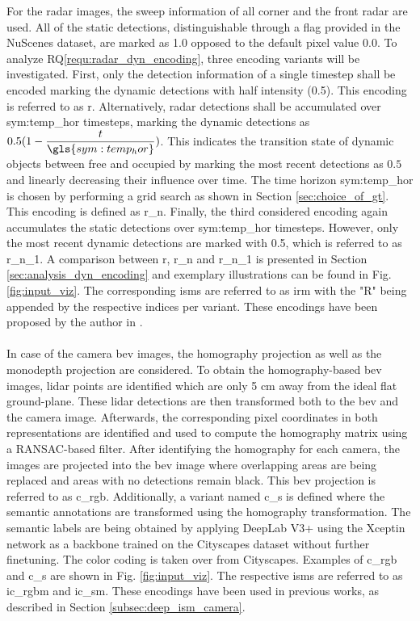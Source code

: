 For the radar images, the sweep information of all corner and the front radar are used. All of the static detections, distinguishable through a flag provided in the NuScenes dataset, are marked as 1.0 opposed to the default pixel value $0.0$. To analyze RQ\ref{requ:radar_dyn_encoding}, three encoding variants will be investigated. First, only the detection information of a single timestep shall be encoded marking the dynamic detections with half intensity (0.5). This encoding is referred to as \gls{r}. Alternatively, radar detections shall be accumulated over \gls{sym:temp_hor} timesteps, marking the dynamic detections as $0.5(1-\dfrac{t}{\gls{sym:temp_hor}})$. This indicates the transition state of dynamic objects between free and occupied by marking the most recent detections as $0.5$ and linearly decreasing their influence over time. The time horizon \gls{sym:temp_hor} is chosen by performing a grid search as shown in Section \ref{sec:choice_of_gt}. This encoding is defined as \gls{r_n}. Finally, the third considered encoding again accumulates the static detections over \gls{sym:temp_hor} timesteps. However, only the most recent dynamic detections are marked with 0.5, which is referred to as \gls{r_n_1}. A comparison between \gls{r}, \gls{r_n} and \gls{r_n_1} is presented in Section \ref{sec:analysis_dyn_encoding} and exemplary illustrations can be found in Fig. \ref{fig:input_viz}. The corresponding \gls{ism}s are referred to as \gls{irm} with the "R" being appended by the respective indices per variant. These encodings have been proposed by the author in \cite{bauer2019deepame,bauer2019deepiv}.
\\\\
In case of the camera \gls{bev} images, the homography projection as well as the \gls{monodepth} projection are considered. To obtain the homography-based \gls{bev} images, lidar points are identified which are only 5 cm away from the ideal flat ground-plane. These lidar detections are then transformed both to the \gls{bev} and the camera image. Afterwards, the corresponding pixel coordinates in both representations are identified and used to compute the homography matrix using a RANSAC-based filter. After identifying the homography for each camera, the images are projected into the \gls{bev} image where overlapping areas are being replaced and areas with no detections remain black. This \gls{bev} projection is referred to as \gls{c_rgb}. Additionally, a variant named \gls{c_s} is defined where the semantic annotations are transformed using the homography transformation. The semantic labels are being obtained by applying DeepLab V3+ \cite{deeplabv3plus2018} using the Xceptin network \cite{chollet2017xception} as a backbone trained on the Cityscapes dataset \cite{cordts2016cityscapes} without further finetuning. The color coding is taken over from Cityscapes. Examples of \gls{c_rgb} and \gls{c_s} are shown in Fig. \ref{fig:input_viz}. The respective \gls{ism}s are referred to as \gls{ic_rgbm} and \gls{ic_sm}. These encodings have been used in previous works, as described in Section \ref{subsec:deep_ism_camera}.
